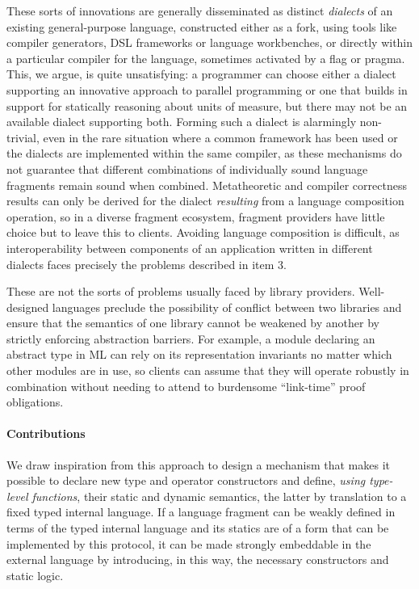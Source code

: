 \documentclass[9pt,preprint]{sigplanconf}
\begin{document}
These sorts of innovations are generally disseminated as distinct \emph{dialects} of an existing general-purpose language, constructed either as a fork, using tools like compiler generators, DSL frame\-works or  language workbenches, or directly within a particular compiler for the language, sometimes activated by a flag or pragma. This, we argue, is quite unsatisfying: a programmer can choose either a dialect supporting an innovative approach to parallel programming or one that builds in support for statically reasoning about units of measure, but there may not be an available dialect supporting both. Forming such a dialect is alarmingly non-trivial, even in the rare situation where a common framework has been used or the dialects are implemented within the same compiler, as these mechanisms do not guarantee that different combinations of individually sound language fragments remain sound when combined. Metatheoretic and compiler correctness results can only be derived for the dialect \emph{resulting} from a language   composition operation, so in a diverse fragment ecosystem, fragment providers have little choice but to leave this to clients. Avoiding language composition is difficult, as interoperability between components of an application written in different dialects faces precisely the problems described in item 3.%

These are not the sorts of problems usually faced by library providers. Well-designed languages preclude the  possibility of conflict between two libraries and ensure that the semantics of one library  cannot be weakened by another by strictly enforcing abstraction barriers. For example, a module declaring an abstract type in ML can rely on its representation invariants no matter which other modules are in use, so clients can assume that they will operate robustly in combination without needing to attend to burdensome ``link-time'' proof obligations. 

\paragraph{Contributions}
We draw inspiration from this approach to design a mechanism that makes it possible to declare new type and operator constructors and define, \emph{using type-level functions}, their static and dynamic semantics, the latter by translation to a fixed typed internal language. If a language fragment can be weakly defined in terms of the typed internal language and its statics are of a form that can be implemented by this protocol, it can be made strongly embeddable in the external language by introducing, in this way, the necessary constructors and static logic. 
\end{document}
